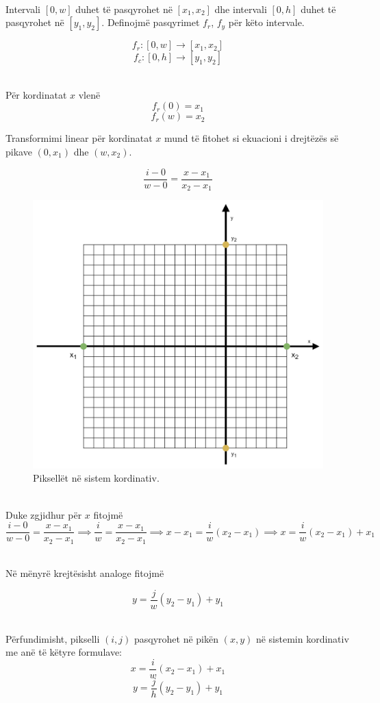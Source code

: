 \noindent \\ Intervali $[0,w]$ duhet të pasqyrohet në $[x_1,x_2]$ dhe intervali $[0,h]$ duhet të pasqyrohet në $[y_1,y_2]$. Definojmë pasqyrimet $f_r$, $f_y$ për këto intervale.

\[
f_r : [0, w] \rightarrow [x_1, x_2]
\]
\[
f_c : [0, h] \rightarrow [y_1, y_2]
\]

\noindent \\Për kordinatat \(x\) vlenë
\[
f_r(0) = x_1
\]
\[
f_r(w) = x_2
\]

\noindent Transformimi linear për kordinatat $x$ mund të fitohet si ekuacioni i drejtëzës së pikave $(0, x_1)$ dhe $(w, x_2)$.

\[
\frac{i - 0}{w - 0} = \frac{x - x_1}{x_2 - x_1}
\]

\begin{figure}[h]
    \centering
    \includegraphics[width=0.6\linewidth]{image_to_coordinate.png}
    \caption{Piksellët në sistem kordinativ.}
    \label{fig:image_coordinate}
\end{figure}

\noindent \\ Duke zgjidhur për $x$ fitojmë
\[
\frac{i - 0}{w - 0} = \frac{x - x_1}{x_2 - x_1} \implies \frac{i}{w} = \frac{x - x_1}{x_2 - x_1} \implies x - x_1 = \frac{i}{w} (x_2 - x_1) \implies x = \frac{i}{w} (x_2 - x_1) + x_1
\]

\noindent \\ Në mënyrë krejtësisht analoge fitojmë

\[
y = \frac{j}{w} (y_2 - y_1) + y_1
\]

\noindent \\ Përfundimisht, pikselli $(i,j)$ pasqyrohet në pikën $(x,y)$ në sistemin kordinativ me anë të këtyre formulave:
\[
x = \frac{i}{w} (x_2 - x_1) + x_1
\]
\[
y = \frac{j}{h} (y_2 - y_1) + y_1
\]


